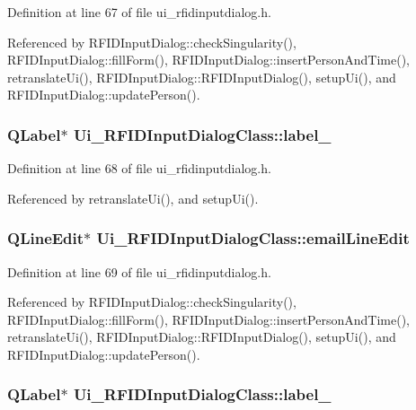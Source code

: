 Definition at line 67 of file ui\_\-rfidinputdialog.h.

Referenced by RFIDInputDialog::checkSingularity(), RFIDInputDialog::fillForm(), RFIDInputDialog::insertPersonAndTime(), retranslateUi(), RFIDInputDialog::RFIDInputDialog(), setupUi(), and RFIDInputDialog::updatePerson().\hypertarget{class_ui___r_f_i_d_input_dialog_class_01203552d5829c81f884bc59317f4d8e}{
\subsubsection[label\_\-10]{\setlength{\rightskip}{0pt plus 5cm}QLabel$\ast$ {\bf Ui\_\-RFIDInputDialogClass::label\_}}}
\label{class_ui___r_f_i_d_input_dialog_class_01203552d5829c81f884bc59317f4d8e}




Definition at line 68 of file ui\_\-rfidinputdialog.h.

Referenced by retranslateUi(), and setupUi().\hypertarget{class_ui___r_f_i_d_input_dialog_class_729f97e2df77d68801004df385955298}{
\subsubsection[emailLineEdit]{\setlength{\rightskip}{0pt plus 5cm}QLineEdit$\ast$ {\bf Ui\_\-RFIDInputDialogClass::emailLineEdit}}}
\label{class_ui___r_f_i_d_input_dialog_class_729f97e2df77d68801004df385955298}




Definition at line 69 of file ui\_\-rfidinputdialog.h.

Referenced by RFIDInputDialog::checkSingularity(), RFIDInputDialog::fillForm(), RFIDInputDialog::insertPersonAndTime(), retranslateUi(), RFIDInputDialog::RFIDInputDialog(), setupUi(), and RFIDInputDialog::updatePerson().\hypertarget{class_ui___r_f_i_d_input_dialog_class_05ccb5a16ae3d611ecb4a6d72c5b3acb}{
\subsubsection[label\_\-7]{\setlength{\rightskip}{0pt plus 5cm}QLabel$\ast$ {\bf Ui\_\-RFIDInputDialogClass::label\_}}}
\label{class_ui___r_f_i_d_input_dialog_class_05ccb5a16ae3d611ecb4a6d72c5b3acb}




